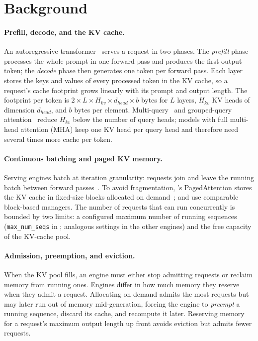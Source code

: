 \section{Background}
\label{sec:background}

\paragraph{Prefill, decode, and the KV cache.}
An autoregressive transformer~\cite{vaswani2017attention} serves a request in two phases. The
\emph{prefill} phase processes the whole prompt in one forward pass and produces the first
output token; the \emph{decode} phase then generates one token per forward pass. Each layer
stores the keys and values of every processed token in the KV cache, so a request's cache
footprint grows linearly with its prompt and output length. The footprint per token is
$2 \times L \times H_{kv} \times d_{head} \times b$ bytes for $L$ layers, $H_{kv}$ KV heads
of dimension $d_{head}$, and $b$ bytes per element. Multi-query~\cite{shazeer2019mqa} and
grouped-query attention~\cite{ainslie2023gqa} reduce $H_{kv}$ below the number of query
heads; models with full multi-head attention (MHA) keep one KV head per query head and
therefore need several times more cache per token.

\paragraph{Continuous batching and paged KV memory.}
Serving engines batch at iteration granularity: requests join and leave the running batch
between forward passes~\cite{yu2022orca}. To avoid fragmentation, \vllm's PagedAttention
stores the KV cache in fixed-size blocks allocated on demand~\cite{kwon2023vllm}; \sglang and
\trt use comparable block-based managers. The number of requests that can run concurrently is
bounded by two limits: a configured maximum number of running sequences (\texttt{max\_num\_seqs}
in \vllm; analogous settings in the other engines) and the free capacity of the KV-cache pool.

\paragraph{Admission, preemption, and eviction.}
When the KV pool fills, an engine must either stop admitting requests or reclaim memory from
running ones. Engines differ in how much memory they reserve when they admit a request.
Allocating on demand admits the most requests but may later run out of memory mid-generation,
forcing the engine to \emph{preempt} a running sequence, discard its cache, and recompute it
later. Reserving memory for a request's maximum output length up front avoids eviction but
admits fewer requests. 

